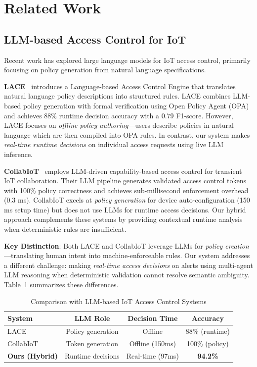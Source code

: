 \section{Related Work}

\subsection{LLM-based Access Control for IoT}

Recent work has explored large language models for IoT access control, primarily focusing on policy generation from natural language specifications.

\textbf{LACE}~\cite{lace2025} introduces a Language-based Access Control Engine that translates natural language policy descriptions into structured rules. LACE combines LLM-based policy generation with formal verification using Open Policy Agent (OPA) and achieves 88\% runtime decision accuracy with a 0.79 F1-score. However, LACE focuses on \textit{offline policy authoring}—users describe policies in natural language which are then compiled into OPA rules. In contrast, our system makes \textit{real-time runtime decisions} on individual access requests using live LLM inference.

\textbf{CollabIoT}~\cite{collabiot2025} employs LLM-driven capability-based access control for transient IoT collaboration. Their LLM pipeline generates validated access control tokens with 100\% policy correctness and achieves sub-millisecond enforcement overhead (0.3 ms). CollabIoT excels at \textit{policy generation} for device auto-configuration (150 ms setup time) but does not use LLMs for runtime access decisions. Our hybrid approach complements these systems by providing contextual runtime analysis when deterministic rules are insufficient.

\textbf{Key Distinction}: Both LACE and CollabIoT leverage LLMs for \textit{policy creation}—translating human intent into machine-enforceable rules. Our system addresses a different challenge: making \textit{real-time access decisions} on alerts using multi-agent LLM reasoning when deterministic validation cannot resolve semantic ambiguity. Table~\ref{tab:related_comparison} summarizes these differences.

\begin{table}[h]
    \centering
    \caption{Comparison with LLM-based IoT Access Control Systems}
    \label{tab:related_comparison}
    \begin{tabular}{lccc}
        \toprule
        \textbf{System} & \textbf{LLM Role} & \textbf{Decision Time} & \textbf{Accuracy} \\
        \midrule
        LACE~\cite{lace2025} & Policy generation & Offline & 88\% (runtime) \\
        CollabIoT~\cite{collabiot2025} & Token generation & Offline (150ms) & 100\% (policy) \\
        \textbf{Ours (Hybrid)} & Runtime decisions & Real-time (97ms) & \textbf{94.2\%} \\
        \bottomrule
    \end{tabular}
\end{table}

